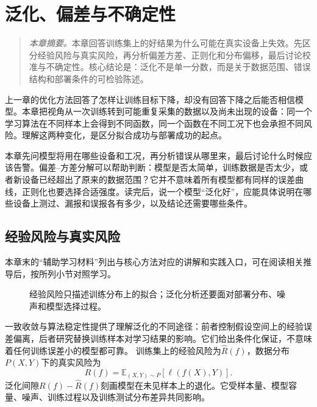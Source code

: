 ﻿\chapter{泛化、偏差与不确定性}
\begin{quote}\small
\textit{本章摘要。}本章回答训练集上的好结果为什么可能在真实设备上失效。先区分经验风险与真实风险，再分析偏差方差、正则化和分布偏移，最后讨论校准与不确定性。核心结论是：泛化不是单一分数，而是关于数据范围、错误结构和部署条件的可检验陈述。
\end{quote}
上一章的优化方法回答了怎样让训练目标下降，却没有回答下降之后能否相信模型。本章把视角从一次训练转到可能重复采集的数据以及尚未出现的设备：同一个学习算法在不同样本上会得到不同函数，同一个函数在不同工况下也会承担不同风险。理解这两种变化，是区分拟合成功与部署成功的起点。

本章先问模型将用在哪些设备和工况，再分析错误从哪里来，最后讨论什么时候应该告警。偏差--方差分解可以帮助判断：模型是否太简单，训练数据是否太少，或者新设备已经超出了原来的数据范围？它并不意味着所有模型都有同样的误差曲线，正则化也要选择合适强度。读完后，说一个模型“泛化好”，应能具体说明在哪些设备上测过、漏报和误报各有多少，以及结论还需要哪些条件。

\section{经验风险与真实风险}

本章末的“辅助学习材料”列出与核心方法对应的讲解和实践入口，可在阅读相关推导后，按所列小节对照学习。

\begin{figure}[htbp]
\centering
{}
\caption{经验风险只描述训练分布上的拟合；泛化分析还要面对部署分布、噪声和模型选择过程。}
\label{fig:generalization-distribution-gap}
\end{figure}
一致收敛与算法稳定性提供了理解泛化的不同途径\cite{vapnik1971uniform,bousquet2002stability}：前者控制假设空间上的经验误差偏离，后者研究替换训练样本对学习结果的影响。它们给出条件化保证，不意味着任何训练误差小的模型都可靠。
训练集上的经验风险为$\hat R(f)$，数据分布$P(X,Y)$下的真实风险为
\begin{equation}
 R(f)=\mathbb{E}_{(X,Y)\sim P}\left[\ell(f(X),Y)\right].
\end{equation}
泛化间隙$R(f)-\hat R(f)$刻画模型在未见样本上的退化。它受样本量、模型容量、噪声、训练过程以及训练测试分布差异共同影响。

